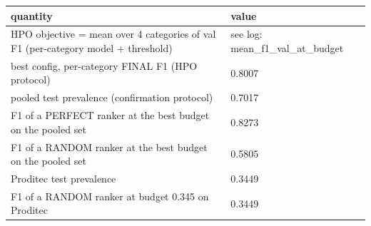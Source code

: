 \begin{tabular}{ll}
\toprule
quantity & value \\
\midrule
HPO objective = mean over 4 categories of val F1 (per-category model + threshold) & see log: mean\_f1\_val\_at\_budget \\
best config, per-category FINAL F1 (HPO protocol) & 0.8007 \\
pooled test prevalence (confirmation protocol) & 0.7017 \\
F1 of a PERFECT ranker at the best budget on the pooled set & 0.8273 \\
F1 of a RANDOM ranker at the best budget on the pooled set & 0.5805 \\
Proditec test prevalence & 0.3449 \\
F1 of a RANDOM ranker at budget 0.345 on Proditec & 0.3449 \\
\bottomrule
\end{tabular}
